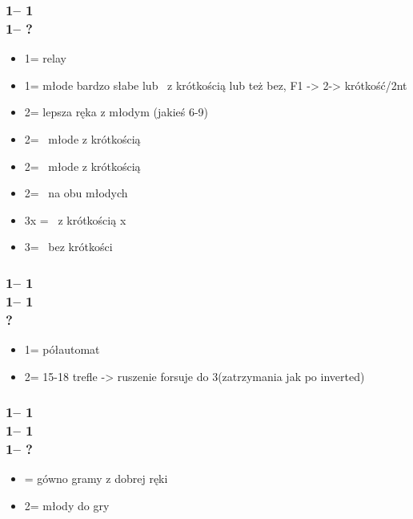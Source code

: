 \documentclass[12pt, a4paper]{article}
\begin{document}
\subsubsection*{1\clubs -- 1\diams \\
                1\hearts -- ?}
\begin{itemize}
    \item 1\spades = relay 
    \item 1\nt = młode bardzo słabe lub \gf\ z krótkością lub też bez, 
    F1 -> 2\minor -> krótkość/2nt 
    \item 2\minor = lepsza ręka z młodym (jakieś 6-9) 
    \item 2\hearts = \inv\ młode z krótkością 
    \item 2\spades = \inv\ młode z krótkością 
    \item 2\nt = \inv\ na obu młodych 
    \item 3x = \gf\ \diams z krótkością x 
    \item 3\diams = \gf\ \diams bez krótkości
\end{itemize}

\subsubsection*{1\clubs -- 1\diams \\
                1\hearts -- 1\spades\\
                ?}
\begin{itemize}
    \item 1\nt = półautomat 
    \item 2\clubs = 15-18 trefle \nf -> ruszenie forsuje do 3\clubs (zatrzymania jak po inverted)
\end{itemize}

\subsubsection*{1\clubs -- 1\diams \\
                1\hearts -- 1\spades\\
                1\nt -- ?}
\begin{itemize}
    \item \pass = gówno gramy z dobrej ręki 
    \item 2\minor = młody do gry
\end{itemize}
\end{document}
